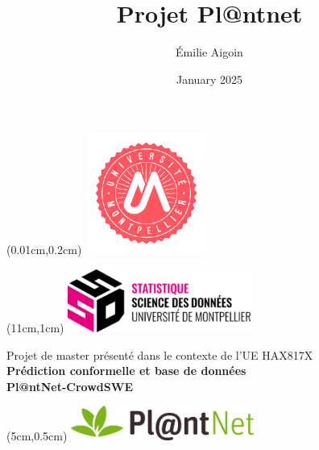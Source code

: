 \documentclass[a4paper,12pt]{article}
\title{Projet Pl@ntnet}
\author{Émilie Aigoin}
\date{January 2025}
\begin{document}
\begin{textblock*}{3cm}(0.01cm,0.2cm)
    \includegraphics[width=4cm]{images/Universite.png}
\end{textblock*}

\begin{textblock*}{3cm}(11cm,1cm)
    \includegraphics[width=6cm]{images/SSD.png} 
\end{textblock*}

\vspace{8cm}
\begin{center}
\large{Projet de master présenté dans le contexte de l'UE HAX817X} \\ \vspace{0.4cm}
    {\LARGE \textbf{Prédiction conformelle et base de données \\ \vspace{0.4cm} Pl@ntNet-CrowdSWE}}\\[1cm]
\end{center}

\begin{textblock*}{3cm}(5cm,0.5cm)
    \includegraphics[width=6cm]{images/plantenet.png}  %
\end{textblock*}
\end{document}

